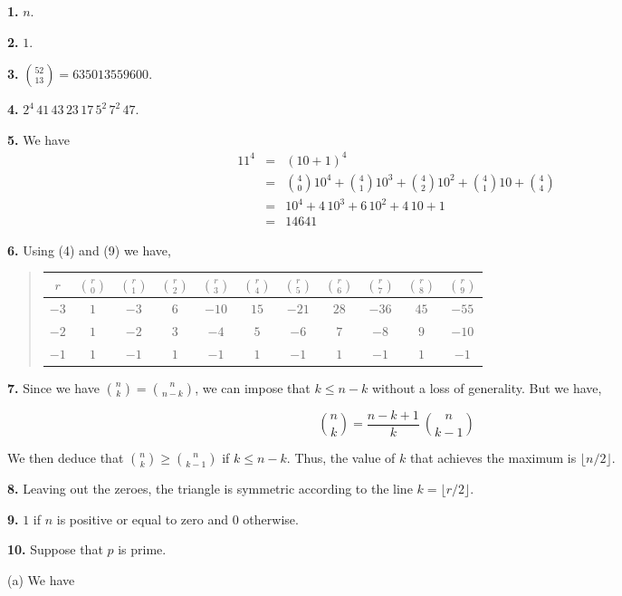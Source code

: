 \documentclass[a4paper,12pt]{article}
\newcommand{\newpar}[1]{\bigskip \noindent \textbf{#1.}}
\newcommand{\subpar}[1]{\medskip \noindent (#1)}
\begin{document}
\newpar{1} $n$.

\newpar{2} $1$.

\newpar{3} ${{52} \choose {13}} = 635013559600$.

\newpar{4} $2^4\,41\,43\,23\,17\,5^2\,7^2\,47$.

\newpar{5} We have
\begin{eqnarray*}
  11^4 &=& (10 + 1)^4 \\
  &=& {4 \choose 0} 10^4 + {4 \choose 1} 10^3 + {4 \choose 2} 10^2 +
  {4 \choose 1} 10 + {4 \choose 4} \\
  &=& 10^4 + 4\,10^3 + 6\,10^2 + 4\,10 + 1 \\
  &=& 14641
\end{eqnarray*}

\newpar{6} Using (4) and (9) we have,
\begin{quote}
  \begin{tabular}{|c|c|c|c|c|c|c|c|c|c|c|}
    \hline $r$ & ${r \choose 0}$ & ${r \choose 1}$ & ${r \choose 2}$ &
    ${r \choose 3}$ & ${r \choose 4}$ &
    ${r \choose 5}$ & ${r \choose 6}$ & ${r \choose 7}$ & ${r \choose
      8}$ & ${r \choose 9}$ \\
    \hline $-3$ & $1$ & $-3$ & $6$ & $-10$ & $15$ & $-21$ & $28$ &
    $-36$ & $45$ & $-55$ \\
    \hline $-2$ & $1$ & $-2$ & $3$ & $-4$ & $5$ & $-6$ & $7$ & $-8$ &
    $9$ & $-10$ \\
    \hline $-1$ & $1$ & $-1$ & $1$ & $-1$ & $1$ & $-1$ & $1$ & $-1$ &
    $1$ & $-1$ \\
    \hline
  \end{tabular}
\end{quote}

\newpar{7}  Since we have ${n \choose k} = {n \choose {n-k}}$, we can impose that $k
\le n-k$ without a loss of generality.  But we have,

\[ {n \choose k} = \frac{n-k+1}{k}\ {n \choose {k-1}} \]

We then deduce that ${n \choose k} \ge {n \choose {k-1}}$ if $k \le n-k$.  Thus, the
value of $k$ that achieves the maximum is $\lfloor n/2\rfloor$.

\newpar{8} Leaving out the zeroes, the triangle is symmetric according
to the line $k = \lfloor r/2\rfloor$.

\newpar{9} $1$ if $n$ is positive or equal to zero and $0$ otherwise.

\newpar{10} Suppose that $p$ is prime.

\subpar{a} We have
\end{document}
